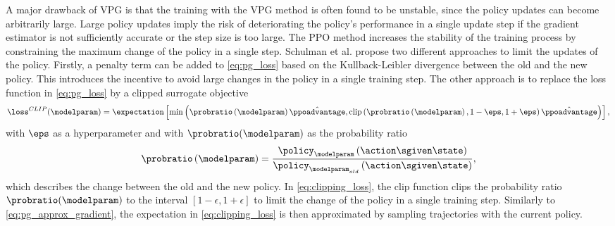 A major drawback of VPG is that the training with the VPG method is often found to be unstable, since the policy updates can become arbitrarily large.
Large policy updates imply the risk of deteriorating the policy's performance in a single update step if the gradient estimator is not sufficiently accurate or the step size is too large.
The PPO method increases the stability of the training process by constraining the maximum change of the policy in a single step. %
Schulman et al. \cite{schulman2017proximal} propose two different approaches to limit the updates of the policy.
Firstly, a penalty term can be added to \eqref{eq:pg_loss} based on the Kullback-Leibler divergence between the old and the new policy.
This introduces the incentive to avoid large changes in the policy in a single training step.
The other approach is to replace the loss function in \eqref{eq:pg_loss} by a clipped surrogate objective
\begin{equation}
  \loss^{CLIP}(\modelparam) = \expectation\left[\min\left( \probratio\left(\modelparam\right)\hat{\ppoadvantage},\mathrm{clip}\left(\probratio\left(\modelparam\right),1-\eps,1+\eps\right)\hat{\ppoadvantage}   \right)   \right],
  \label{eq:clipping_loss}
\end{equation}
with $\eps$ as a hyperparameter and with $\probratio(\modelparam)$ as the probability ratio
\begin{equation}
  \probratio\left(\modelparam\right)=\frac{\policy_{\modelparam}\left(\action\sgiven\state\right)}{\policy_{\modelparam_{old}}\left(\action\sgiven\state\right)},
  \label{eq:prob_ratio}
\end{equation}
which describes the change between the old and the new policy.
In \eqref{eq:clipping_loss}, the clip function clips the probability ratio $\probratio(\modelparam)$ to the interval $\left[1-\epsilon,1+\epsilon\right]$ to limit the change of the policy in a single training step.
Similarly to \eqref{eq:pg_approx_gradient}, the expectation in \eqref{eq:clipping_loss} is then approximated by sampling trajectories with the current policy.

